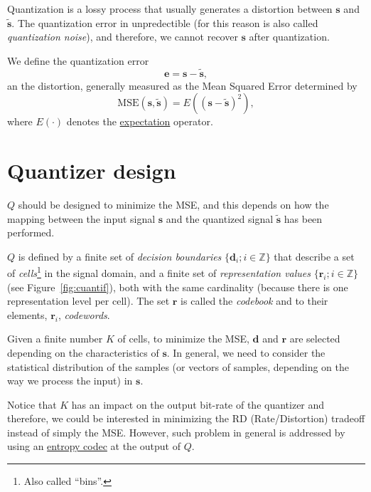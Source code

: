 Quantization is a lossy process that usually generates a distortion
between ${\mathbf s}$ and $\tilde{\mathbf s}$. The quantization error
in unpredectible (for this reason is also called \emph{quantization
noise}), and therefore, we cannot recover ${\mathbf s}$ after
quantization.

We define the quantization error
\begin{equation}
  {\mathbf e} = {\mathbf s} - \tilde{{\mathbf s}},
\end{equation}
an the distortion, generally measured as the Mean Squared Error
determined by
\begin{equation}
  \text{MSE}({\mathbf s}, \tilde{\mathbf s}) = E(({\mathbf s} - \tilde{\mathbf s})^2),
  \label{eq:MSE}
\end{equation}
where $E(\cdot)$ denotes the
\href{https://en.wikipedia.org/wiki/Expected_value}{expectation}
operator.

\section{Quantizer design}

$Q$ should be designed to minimize the MSE, and this depends on how
the mapping between the input signal ${\mathbf s}$ and the quantized
signal $\tilde{\mathbf s}$ has been performed.

$Q$ is defined by a finite set of \emph{decision boundaries}
$\{{\mathbf d}_i; i\in {\mathbb{Z}}\}$ that describe a set of
\emph{cells}\footnote{Also called ``bins''.} in the signal domain, and
a finite set of \emph{representation values} $\{{\mathbf r}_i; i\in
{\mathbb{Z}}\}$ (see Figure~\ref{fig:cuantif}), both with the same
cardinality (because there is one representation level per cell). The
set ${\mathbf r}$ is called the \emph{codebook} and to their elements,
${\mathbf r}_i$, \emph{codewords}.

Given a finite number $K$ of cells, to minimize the MSE, ${\mathbf d}$
and ${\mathbf r}$ are selected depending on the characteristics of
${\mathbf s}$. In general, we need to consider the statistical
distribution of the samples (or vectors of samples, depending on the
way we process the input) in ${\mathbf s}$.

Notice that $K$ has an impact on the output bit-rate of the quantizer
and therefore, we could be interested in minimizing the RD
(Rate/Distortion) tradeoff instead of simply the MSE. However, such
problem in general is addressed by using an
\href{https://en.wikipedia.org/wiki/Entropy_coding}{entropy codec} at
the output of $Q$.

